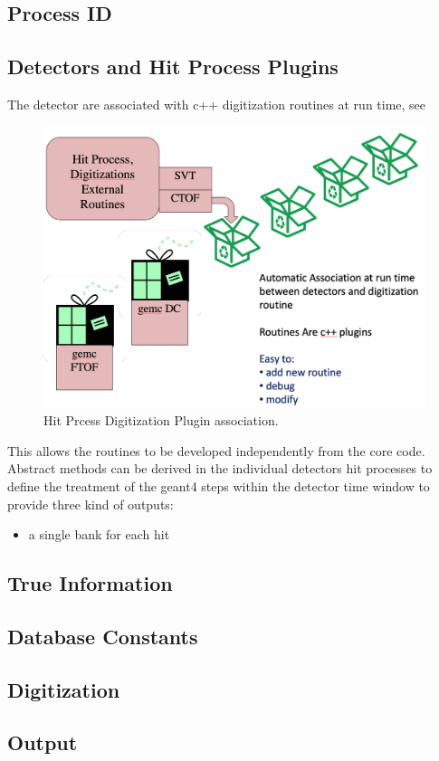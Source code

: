 \subsection{Process ID}



\subsection{Detectors and Hit Process Plugins}
The detector are associated with c++ digitization routines at run time, see 

\begin{figure}
	\centering
	\includegraphics[width=0.95\columnwidth,keepaspectratio]{img/pluginsAssociation.png}
	\caption{Hit Prcess Digitization Plugin association.}
	\label{fig:pluginsAssociation}
\end{figure}


This allows the routines to
be developed independently from the core code. Abstract methods can be derived in the individual detectors hit processes
to define the treatment of the geant4 steps within the detector time window to provide three kind of outputs:
\begin{itemize}
	\item a single bank for each hit
\end{itemize}




\subsection{True Information}

\subsection{Database Constants}


\subsection{Digitization}

\subsection{Output}

